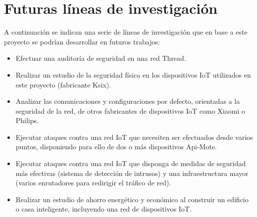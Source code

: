 \section {Futuras líneas de investigación}
A continuación se indican una serie de líneas de investigación que en base a este proyecto se podrían desarrollar en futuros trabajos:
\begin{itemize}
\item Efectuar una auditoría de seguridad en una red Thread.
\item Realizar un estudio de la seguridad física en los dispositivos IoT utilizados en este proyecto (fabricante Ksix).
\item Analizar las comunicaciones y configuraciones por defecto, orientadas a la seguridad de la red, de otros fabricantes de dispositivos IoT como Xiaomi o Philips.
\item Ejecutar ataques contra una red IoT que necesiten ser efectuados desde varios puntos, disponiendo para ello de dos o más dispositivos Api-Mote.
\item Ejecutar ataques contra una red IoT que disponga de medidas de seguridad más efectivas (sistema de detección de intrusos) y una infraestructura mayor (varios enrutadores para redirigir el tráfico de red).
\item Realizar un estudio de ahorro energético y económico al construir un edificio o casa inteligente, incluyendo una red de dispositivos IoT.
\end{itemize}




